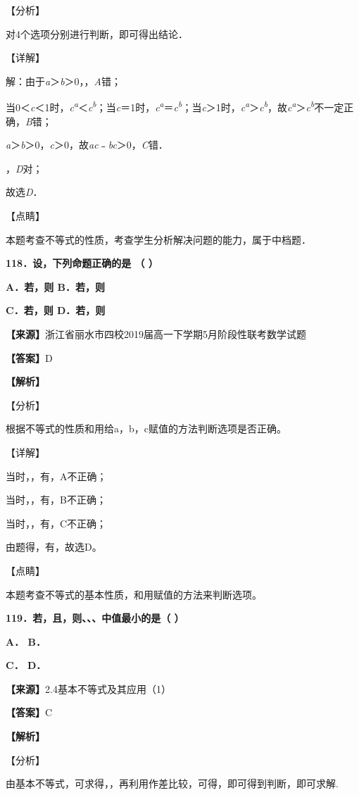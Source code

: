 \documentclass[
]{article}
\begin{document}
【分析】

对4个选项分别进行判断，即可得出结论．

【详解】

解：由于\emph{a}＞\emph{b}＞0，，\emph{A}错；

当0＜\emph{c}＜1时，\emph{c\textsuperscript{a}}＜\emph{c\textsuperscript{b}}；当\emph{c}＝1时，\emph{c\textsuperscript{a}}＝\emph{c\textsuperscript{b}}；当\emph{c}＞1时，\emph{c\textsuperscript{a}}＞\emph{c\textsuperscript{b}}，故\emph{c\textsuperscript{a}}＞\emph{c\textsuperscript{b}}不一定正确，\emph{B}错；

\emph{a}＞\emph{b}＞0，\emph{c}＞0，故\emph{ac}﹣\emph{bc}＞0，\emph{C}错．

，\emph{D}对；

故选\emph{D}．

【点睛】

本题考查不等式的性质，考查学生分析解决问题的能力，属于中档题．

\textbf{118．设，下列命题正确的是 （ ）}

\textbf{A．若，则 B．若，则}

\textbf{C．若，则 D．若，则}

\textbf{【来源】}浙江省丽水市四校2019届高一下学期5月阶段性联考数学试题

\textbf{【答案】}D

\textbf{【解析】}

【分析】

根据不等式的性质和用给a，b，c赋值的方法判断选项是否正确。

【详解】

当时，，有，A不正确；

当时，，有，B不正确；

当时，，有，C不正确；

由题得，有，故选D。

【点睛】

本题考查不等式的基本性质，和用赋值的方法来判断选项。

\textbf{119．若，且，则、、、中值最小的是（ ）}

\textbf{A． B．}

\textbf{C． D．}

\textbf{【来源】}2.4基本不等式及其应用（1）

\textbf{【答案】}C

\textbf{【解析】}

【分析】

由基本不等式，可求得，，再利用作差比较，可得，即可得到判断，即可求解.
\end{document}

